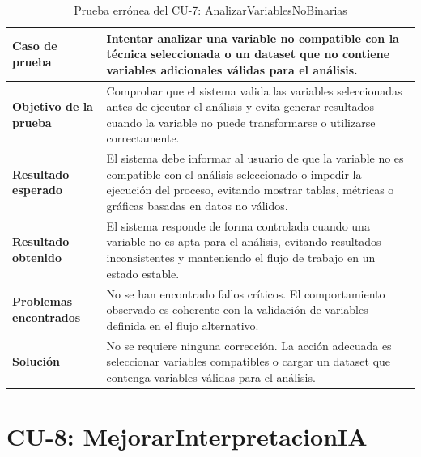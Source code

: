 \begin{table}[H]
\centering
\small
\begin{tabularx}{\textwidth}{|p{}|X|}
\hline
\textbf{Caso de prueba} & Intentar analizar una variable no compatible con la técnica seleccionada o un dataset que no contiene variables adicionales válidas para el análisis. \\ \hline
\textbf{Objetivo de la prueba} & Comprobar que el sistema valida las variables seleccionadas antes de ejecutar el análisis y evita generar resultados cuando la variable no puede transformarse o utilizarse correctamente. \\ \hline
\textbf{Resultado esperado} & El sistema debe informar al usuario de que la variable no es compatible con el análisis seleccionado o impedir la ejecución del proceso, evitando mostrar tablas, métricas o gráficas basadas en datos no válidos. \\ \hline
\textbf{Resultado obtenido} & El sistema responde de forma controlada cuando una variable no es apta para el análisis, evitando resultados inconsistentes y manteniendo el flujo de trabajo en un estado estable. \\ \hline
\textbf{Problemas encontrados} & No se han encontrado fallos críticos. El comportamiento observado es coherente con la validación de variables definida en el flujo alternativo. \\ \hline
\textbf{Solución} & No se requiere ninguna corrección. La acción adecuada es seleccionar variables compatibles o cargar un dataset que contenga variables válidas para el análisis. \\ \hline
\end{tabularx}
\caption{Prueba errónea del CU-7: AnalizarVariablesNoBinarias}
\label{tab:prueba_erronea_cu7}
\normalsize
\end{table}

\Needspace{0.80\textheight}
\section{CU-8: MejorarInterpretacionIA}


